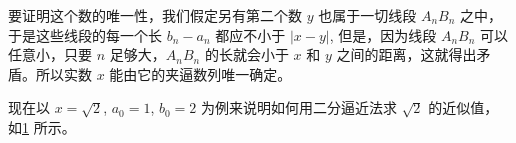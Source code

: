 要证明这个数的唯一性，我们假定另有第二个数 $y$ 也属于一切线段 $A_nB_n$ 之中，于是这些线段的每一个长 $b_n-a_n$ 都应不小于 $|x-y|$, 但是，因为线段 $A_nB_n$ 可以任意小，只要 $n$ 足够大，$A_nB_n$ 的长就会小于 $x$ 和 $y$ 之间的距离，这就得出矛盾。所以实数 $x$ 能由它的夹逼数列唯一确定。

现在以 $x=\sqrt{2}$, $a_0=1$, $b_0=2$ 为例来说明如何用二分逼近法求 $\sqrt{2}$ 的近似值，如\cref{fig:sqrt2} 所示。
\begin{figure}
    \caption{}\label{fig:sqrt2}
\end{figure}

